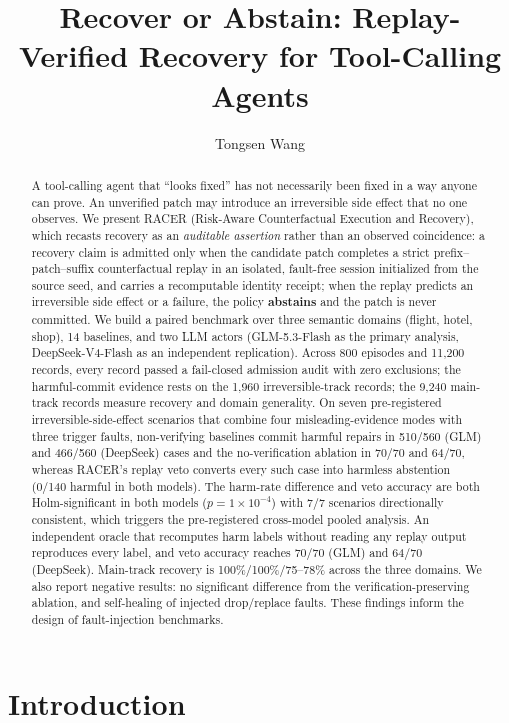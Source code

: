 \documentclass[10pt]{article}
\title{Recover or Abstain: Replay-Verified Recovery for Tool-Calling Agents}
\author{Tongsen Wang}
\begin{document}
\maketitle

\begin{abstract}
A tool-calling agent that ``looks fixed'' has not necessarily been fixed in a way anyone can prove. An unverified patch may introduce an irreversible side effect that no one observes. We present RACER (Risk-Aware Counterfactual Execution and Recovery), which recasts recovery as an \emph{auditable assertion} rather than an observed coincidence: a recovery claim is admitted only when the candidate patch completes a strict prefix--patch--suffix counterfactual replay in an isolated, fault-free session initialized from the source seed, and carries a recomputable identity receipt; when the replay predicts an irreversible side effect or a failure, the policy \textbf{abstains} and the patch is never committed. We build a paired benchmark over three semantic domains (flight, hotel, shop), 14 baselines, and two LLM actors (GLM-5.3-Flash as the primary analysis, DeepSeek-V4-Flash as an independent replication). Across 800 episodes and 11,200 records, every record passed a fail-closed admission audit with zero exclusions; the harmful-commit evidence rests on the 1,960 irreversible-track records; the 9,240 main-track records measure recovery and domain generality. On seven pre-registered irreversible-side-effect scenarios that combine four misleading-evidence modes with three trigger faults, non-verifying baselines commit harmful repairs in 510/560 (GLM) and 466/560 (DeepSeek) cases and the no-verification ablation in 70/70 and 64/70, whereas RACER's replay veto converts every such case into harmless abstention (0/140 harmful in both models). The harm-rate difference and veto accuracy are both Holm-significant in both models ($p = 1\times10^{-4}$) with 7/7 scenarios directionally consistent, which triggers the pre-registered cross-model pooled analysis. An independent oracle that recomputes harm labels without reading any replay output reproduces every label, and veto accuracy reaches 70/70 (GLM) and 64/70 (DeepSeek). Main-track recovery is 100\%/100\%/75--78\% across the three domains. We also report negative results: no significant difference from the verification-preserving ablation, and self-healing of injected drop/replace faults. These findings inform the design of fault-injection benchmarks.
\end{abstract}

\section{Introduction}
\end{document}
